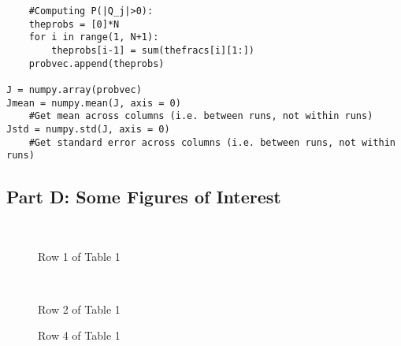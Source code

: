 \documentclass[english]{article}
\begin{document}
\begin{singlespace}
\begin{verbatim}
    #Computing P(|Q_j|>0):
    theprobs = [0]*N
    for i in range(1, N+1):
        theprobs[i-1] = sum(thefracs[i][1:])
    probvec.append(theprobs)
    
J = numpy.array(probvec)
Jmean = numpy.mean(J, axis = 0)
    #Get mean across columns (i.e. between runs, not within runs)
Jstd = numpy.std(J, axis = 0)
    #Get standard error across columns (i.e. between runs, not within runs)

\end{verbatim}
\end{singlespace}
\pagebreak

\subsection*{Part D: Some Figures of Interest}

\begin{figure}[h!]
  \centering
    ~
  \caption{Row 1 of Table 1}
\end{figure}

\begin{figure}[h!]
  \centering
    ~
  \caption{Row 2 of Table 1}
\end{figure}

\begin{figure}[h!]
  \centering
  \caption{Row 4 of Table 1}
\end{figure}
\end{document}
